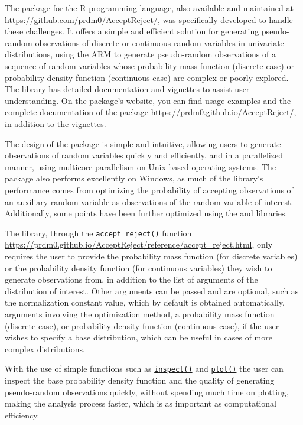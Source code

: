 The  package \citep{AcceptReject} for the R programming language, also available and maintained at \url{https://github.com/prdm0/AcceptReject/}, was specifically developed to handle these challenges. It offers a simple and efficient solution for generating pseudo-random observations of discrete or continuous random variables in univariate distributions, using the ARM to generate pseudo-random observations of a sequence of random variables whose probability mass function (discrete case) or probability density function (continuous case) are complex or poorly explored. The library has detailed documentation and vignettes to assist user understanding. On the package's website, you can find usage examples and the complete documentation of the package \url{https://prdm0.github.io/AcceptReject/}, in addition to the vignettes.

The design of the  package is simple and intuitive, allowing users to generate observations of random variables quickly and efficiently, and in a parallelized manner, using multicore parallelism on Unix-based operating systems. The package also performs excellently on Windows, as much of the library's performance comes from optimizing the probability of accepting observations of an auxiliary random variable as observations of the random variable of interest. Additionally, some points have been further optimized using the  \citep{eddelbuettel2024package} and  \citep{eddelbuettel2014rcpparmadillo} libraries.

The library, through the \texttt{accept\_reject()} function \url{https://prdm0.github.io/AcceptReject/reference/accept_reject.html}, only requires the user to provide the probability mass function (for discrete variables) or the probability density function (for continuous variables) they wish to generate observations from, in addition to the list of arguments of the distribution of interest. Other arguments can be passed and are optional, such as the normalization constant value, which by default is obtained automatically, arguments involving the optimization method, a probability mass function (discrete case), or probability density function (continuous case), if the user wishes to specify a base distribution, which can be useful in cases of more complex distributions.

With the use of simple functions such as \href{https://prdm0.github.io/AcceptReject/reference/}{\texttt{inspect()}} and \href{https://prdm0.github.io/AcceptReject/reference/plot.accept_reject.html}{\texttt{plot()}} the user can inspect the base probability density function and the quality of generating pseudo-random observations quickly, without spending much time on plotting, making the analysis process faster, which is as important as computational efficiency.

